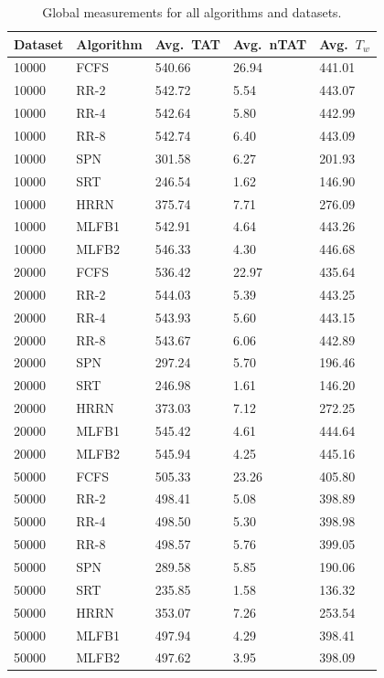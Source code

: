 \documentclass[a4paper,11pt]{article}
\begin{document}
\begin{table}[H]
    \centering
    \begin{tabular}{@{}lllll@{}}
        \toprule
        Dataset & Algorithm & Avg.\ TAT & Avg.\ nTAT & Avg.\ $T_w$ \\
        \midrule
        10000 & FCFS   & 540.66 & 26.94 & 441.01 \\
        10000 & RR-2   & 542.72 & 5.54 & 443.07 \\
        10000 & RR-4   & 542.64 & 5.80 & 442.99 \\
        10000 & RR-8   & 542.74 & 6.40 & 443.09 \\
        10000 & SPN    & 301.58 & 6.27 & 201.93 \\
        10000 & SRT    & 246.54 & 1.62 & 146.90 \\
        10000 & HRRN   & 375.74 & 7.71 & 276.09 \\
        10000 & MLFB1  & 542.91 & 4.64 & 443.26 \\
        10000 & MLFB2  & 546.33 & 4.30 & 446.68 \\
        \midrule
        20000 & FCFS   & 536.42 & 22.97 & 435.64 \\
        20000 & RR-2   & 544.03 & 5.39 & 443.25 \\
        20000 & RR-4   & 543.93 & 5.60 & 443.15 \\
        20000 & RR-8   & 543.67 & 6.06 & 442.89 \\
        20000 & SPN    & 297.24 & 5.70 & 196.46 \\
        20000 & SRT    & 246.98 & 1.61 & 146.20 \\
        20000 & HRRN   & 373.03 & 7.12 & 272.25 \\
        20000 & MLFB1  & 545.42 & 4.61 & 444.64 \\
        20000 & MLFB2  & 545.94 & 4.25 & 445.16 \\
        \midrule
        50000 & FCFS   & 505.33 & 23.26 & 405.80 \\
        50000 & RR-2   & 498.41 & 5.08 & 398.89 \\
        50000 & RR-4   & 498.50 & 5.30 & 398.98 \\
        50000 & RR-8   & 498.57 & 5.76 & 399.05 \\
        50000 & SPN    & 289.58 & 5.85 & 190.06 \\
        50000 & SRT    & 235.85 & 1.58 & 136.32 \\
        50000 & HRRN   & 353.07 & 7.26 & 253.54 \\
        50000 & MLFB1  & 497.94 & 4.29 & 398.41 \\
        50000 & MLFB2  & 497.62 & 3.95 & 398.09 \\
        \bottomrule
    \end{tabular}
    \caption{Global measurements for all algorithms and datasets.}
    \label{tab:global-results}
\end{table}
\end{document}

